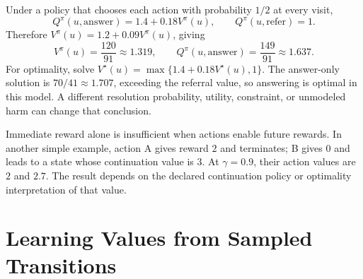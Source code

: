 \par\addvspace{\intextsep}\noindent\begin{minipage}{\linewidth}
\centering
{}
\label{fig:rl-small-mdp}
\end{minipage}\par\addvspace{\intextsep}

Under a policy that chooses each action with probability $1/2$ at every visit,
\[
Q^\pi(u,\mathrm{answer})=1.4+0.18V^\pi(u),
\qquad Q^\pi(u,\mathrm{refer})=1.
\]
Therefore $V^\pi(u)=1.2+0.09V^\pi(u)$, giving
\[
V^\pi(u)=\frac{120}{91}\approx1.319,\qquad
Q^\pi(u,\mathrm{answer})=\frac{149}{91}\approx1.637.
\]
For optimality, solve $V^\star(u)=\max\{1.4+0.18V^\star(u),1\}$. The answer-only solution is $70/41\approx1.707$, exceeding the referral value, so answering is optimal in this model. A different resolution probability, utility, constraint, or unmodeled harm can change that conclusion.

Immediate reward alone is insufficient when actions enable future rewards. In another simple example, action A gives reward $2$ and terminates; B gives $0$ and leads to a state whose continuation value is $3$. At $\gamma=0.9$, their action values are $2$ and $2.7$. The result depends on the declared continuation policy or optimality interpretation of that value.

\section{Learning Values from Sampled Transitions}
\label{sec:rl-credit-assignment}


